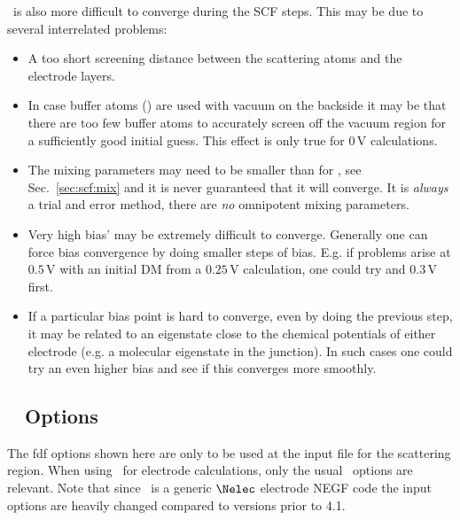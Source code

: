 \tsiesta\ is also more difficult to converge during the SCF
steps. This may be due to several interrelated problems:
%
\begin{itemize}
  
  \item%
  A too short screening distance between the scattering atoms
  and the electrode layers.

  
  \item%
  In case buffer atoms () are used with
  vacuum on the backside it may be that there are too few buffer atoms
  to accurately screen off the vacuum region for a sufficiently good
  initial guess. This effect is only true for $0\,\mathrm V$
  calculations.

  
  \item%
  The mixing parameters may need to be smaller than for \siesta,
  see Sec.~\ref{sec:scf:mix} and it is never guaranteed that it will
  converge. It is \emph{always} a trial and error method, there are
  \emph{no} omnipotent mixing parameters.

  
  \item%
  Very high bias' may be extremely difficult to
  converge. Generally one can force bias convergence by doing smaller
  steps of bias. E.g. if problems arise at $0.5\,\mathrm V$ with an
  initial DM from a $0.25\,\mathrm V$ calculation, one could try and
  $0.3\,\mathrm V$ first.

  
  \item%
  If a particular bias point is hard to converge, even by doing
  the previous step, it may be related to an eigenstate close to the
  chemical potentials of either electrode (e.g. a molecular eigenstate
  in the junction). In such cases one could try an even higher bias
  and see if this converges more smoothly.

\end{itemize}



\subsection{\texorpdfstring{\tsiesta\ }{TranSIESTA} Options}

The fdf options shown here are only to be used at the input file for
the scattering region. When using \tsiesta\ for electrode
calculations, only the usual \siesta\ options are relevant.
%
Note that since \tsiesta\ is a generic $\Nelec$ electrode NEGF code the
input options are heavily changed compared to versions prior to 4.1.

